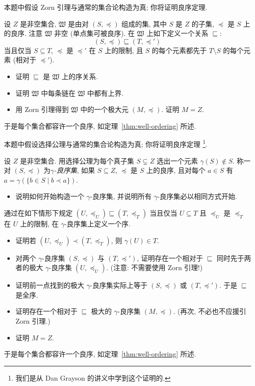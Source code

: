 \begin{prob}
\label{ex:wot-zorn}
本题中假设 Zorn 引理与通常的集合论构造为真; 你将证明良序定理.

\noindent 设 $Z$ 是非空集合, $\mathfrak{W}$ 是由对 $(S,\preceq)$ 组成的集, 其中 $S$ 是 $Z$ 的子集, $\preceq$ 是 $S$ 上的良序. 注意 $\mathfrak{W}$ 非空 (单点集可被良序). 在 $\mathfrak{W}$ 上如下定义一个关系 $\sqsubseteq$:
\[
(S,\preceq)\sqsubseteq (T,\preceq')
\]
当且仅当 $S\subseteq T$, $\preceq$ 是 $\preceq'$ 在 $S$ 上的限制, 且 $S$ 的每个元素都先于 $T\setminus S$ 的每个元素 (相对于 $\preceq'$).
\begin{itemize}
\item 证明 $\sqsubseteq$ 是 $\mathfrak{W}$ 上的序关系.
\item 证明 $\mathfrak{W}$ 中每条链在 $\mathfrak{W}$ 中都有上界.
\item 用 Zorn 引理得到 $\mathfrak{W}$ 中的一个极大元 $(M,\preceq)$. 证明 $M=Z$.
\end{itemize}
于是每个集合都容许一个良序, 如定理~\ref{thm:well-ordering} 所述.
\end{prob}

\begin{prob}
\label{ex:ac-wot-grayson}
本题中假设选择公理与通常的集合论构造为真; 你将证明良序定理%
\footnote{我们是从 Dan Grayson 的讲义中学到这个证明的.}.

\noindent 设 $Z$ 是非空集合. 用选择公理为每个真子集 $S\subsetneq Z$ 选出一个元素 $\gamma(S)\notin S$. 称一对 $(S,\preceq)$ 为\emph{$\gamma$-良序集}, 如果 $S\subseteq Z$, $\preceq$ 是 $S$ 上的良序, 且对每个 $a\in S$ 有 $a=\gamma(\{b\in S\mid b\prec a\})$.
\begin{itemize}
\item 说明如何开始构造一个 $\gamma$-良序集, 并说明所有 $\gamma$-良序集必以相同方式开始.
\end{itemize}
通过在如下情形下规定 $(U,\preceq_U)\sqsubseteq (T,\preceq_T)$ 当且仅当 $U\subseteq T$ 且 $\preceq_U$ 是 $\preceq_T$ 在 $U$ 上的限制, 在 $\gamma$-良序集上定义一个序.
\begin{itemize}
\item 证明若 $(U,\preceq_U)\prec (T,\preceq_T)$, 则 $\gamma(U)\in T$.
\item 对两个 $\gamma$-良序集 $(S,\preceq)$ 与 $(T,\preceq')$, 证明存在一个相对于 $\sqsubseteq$ 同时先于两者的极大 $\gamma$-良序集 $(U,\preceq_U)$. (注意: 不需要使用 Zorn 引理!)
\item 证明前一点找到的极大 $\gamma$-良序集实际上等于 $(S,\preceq)$ 或 $(T,\preceq')$. 于是 $\sqsubseteq$ 是全序.
\item 证明存在一个相对于 $\sqsubseteq$ 极大的 $\gamma$-良序集 $(M,\preceq)$. (再次, 不必也不应援引 Zorn 引理.)
\item 证明 $M=Z$.
\end{itemize}
于是每个集合都容许一个良序, 如定理~\ref{thm:well-ordering} 所述.
\end{prob}


